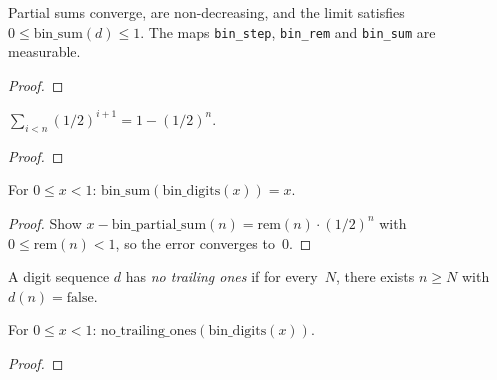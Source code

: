 \begin{lemma}\label{lem:bin_sum_bounds}
  \rocqok
  Partial sums converge, are non-decreasing, and the limit satisfies
  $0 \leq \mathrm{bin\_sum}(d) \leq 1$. The maps \texttt{bin\_step}, \texttt{bin\_rem} and \texttt{bin\_sum} are measurable.
\end{lemma}
\begin{proof}\rocqok\end{proof}

\begin{lemma}\label{lem:geom_half_sum}
  \rocqok
  $\sum_{i<n} (1/2)^{i+1} = 1 - (1/2)^n$.
\end{lemma}
\begin{proof}\rocqok\end{proof}

\begin{theorem}\label{thm:bin_digits_reconstruction}
  \rocqok
  For $0 \leq x < 1$: $\mathrm{bin\_sum}(\mathrm{bin\_digits}(x)) = x$.
\end{theorem}
\begin{proof}
  \rocqok
  Show $x - \mathrm{bin\_partial\_sum}(n) = \mathrm{rem}(n) \cdot (1/2)^n$
  with $0 \leq \mathrm{rem}(n) < 1$, so the error converges to~$0$.
\end{proof}

\begin{definition}\label{def:no_trailing_ones}
  \rocqok
  A digit sequence $d$ has \emph{no trailing ones} if for every~$N$,
  there exists $n \geq N$ with $d(n) = \mathrm{false}$.
\end{definition}

\begin{lemma}\label{lem:bin_digits_no_trailing_ones}
  \rocqok
  For $0 \leq x < 1$: $\mathrm{no\_trailing\_ones}(\mathrm{bin\_digits}(x))$.
\end{lemma}
\begin{proof}\rocqok\end{proof}

